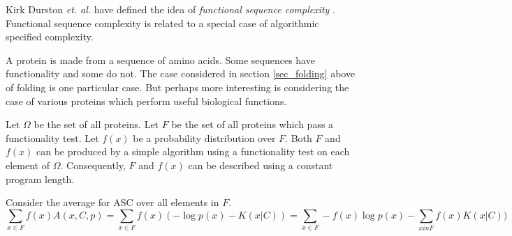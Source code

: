 Kirk Durston {\it et. al.} have defined the idea of {\it functional sequence complexity} \citep{Durston2007}.
Functional sequence complexity is related to a special case of algorithmic specified complexity.

A protein is made from a sequence of amino acids.
Some sequences have functionality and some do not.
The case considered in section \ref{sec_folding} above of folding is one particular case.
But perhaps more interesting is considering the case of various proteins which perform useful biological functions.

Let $\Omega$ be the set of all proteins.
Let $F$ be the set of all proteins which pass a functionality test.
Let $f(x)$ be a probability distribution over $F$.
Both $F$ and $f(x)$ can be produced by a simple algorithm using a functionality test on each element of $\Omega$.
Consequently, $F$ and $f(x)$ can be described using a constant program length.

Consider the average for ASC over all elements in $F$.
\begin{equation}
    \label{ASC.FSC.1}
    \sum_{x \in F} f(x) A(x,C,p) 
    = \sum_{x \in F} f(x) (-\log p(x) - K(x|C))
    = \sum_{x \in F} -f(x)\log p(x) - \sum_{x in F} f(x) K(x|C))
\end{equation}

